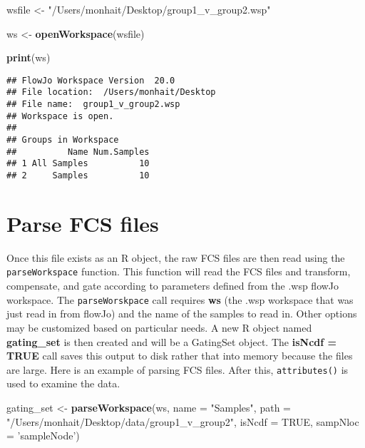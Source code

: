 \documentclass[]{book}
\newenvironment{Shaded}{\begin{snugshade}}{\end{snugshade}}
\newcommand{\DataTypeTok}[1]{\textcolor[rgb]{0.13,0.29,0.53}{#1}}
\newcommand{\KeywordTok}[1]{\textcolor[rgb]{0.13,0.29,0.53}{\textbf{#1}}}
\newcommand{\NormalTok}[1]{#1}
\newcommand{\OtherTok}[1]{\textcolor[rgb]{0.56,0.35,0.01}{#1}}
\newcommand{\StringTok}[1]{\textcolor[rgb]{0.31,0.60,0.02}{#1}}
\begin{document}
\begin{Shaded}
\begin{Highlighting}[]
\NormalTok{wsfile <-}\StringTok{ "/Users/monhait/Desktop/group1_v_group2.wsp"}
\end{Highlighting}
\end{Shaded}

\begin{Shaded}
\begin{Highlighting}[]
\NormalTok{ws <-}\StringTok{ }\KeywordTok{openWorkspace}\NormalTok{(wsfile)}
\end{Highlighting}
\end{Shaded}

\begin{Shaded}
\begin{Highlighting}[]
\KeywordTok{print}\NormalTok{(ws)}
\end{Highlighting}
\end{Shaded}

\begin{verbatim}
## FlowJo Workspace Version  20.0 
## File location:  /Users/monhait/Desktop 
## File name:  group1_v_group2.wsp 
## Workspace is open. 
## 
## Groups in Workspace
##          Name Num.Samples
## 1 All Samples          10
## 2     Samples          10
\end{verbatim}

\hypertarget{parse-fcs-files}{%
\section{Parse FCS files}\label{parse-fcs-files}}

Once this file exists as an R object, the raw FCS files are then read using the \texttt{parseWorkspace} function. This function will read the FCS files and transform, compensate, and gate according to parameters defined from the .wsp flowJo workspace. The \texttt{parseWorskpace} call requires \textbf{ws} (the .wsp workspace that was just read in from flowJo) and the name of the samples to read in. Other options may be customized based on particular needs. A new R object named \textbf{gating\_set} is then created and will be a GatingSet object. The \textbf{isNcdf = TRUE} call saves this output to disk rather that into memory because the files are large. Here is an example of parsing FCS files. After this, \texttt{attributes()} is used to examine the data.

\begin{Shaded}
\begin{Highlighting}[]
\NormalTok{gating_set <-}\StringTok{ }\KeywordTok{parseWorkspace}\NormalTok{(ws, }\DataTypeTok{name =} \StringTok{"Samples"}\NormalTok{, }\DataTypeTok{path =} \StringTok{"/Users/monhait/Desktop/data/group1_v_group2"}\NormalTok{, }\DataTypeTok{isNcdf =} \OtherTok{TRUE}\NormalTok{, }\DataTypeTok{sampNloc =} \StringTok{'sampleNode'}\NormalTok{)}
\end{Highlighting}
\end{Shaded}
\end{document}
